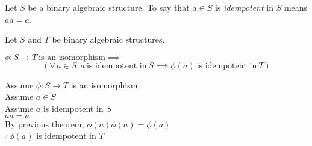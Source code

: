 \documentclass[letterpaper,12pt,fleqn]{article}
\newcommand{\p}{\phi}
\begin{document}
\begin{definition}
  Let $S$ be a binary algebraic structure. To say that $a\in S$ is
  \emph{idempotent} in $S$ means $aa=a$.
\end{definition}

\begin{theorem}
  Let $S$ and $T$ be binary algebraic structures.
  
  $\p:S\to T\ \mbox{is an isomorphism}\implies$
  \[\left(\forall\,a\in S,a\ \mbox{is idempotent in}\ S\implies
    \p(a)\ \mbox{is idempotent in}\ T\right)\]
\end{theorem}

\begin{theproof}
  Assume $\p:S\to T$ is an isomorphism \\
  Assume $a\in S$ \\
  Assume $a$ is idempotent in $S$ \\
  $aa=a$ \\
  By previous theorem, $\p(a)\p(a)=\p(a)$ \\
  $\therefore \p(a)$ is idempotent in $T$
\end{theproof}
\end{document}
